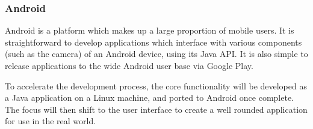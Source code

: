 \subsubsection{Android}

Android\cite{android} is a platform which makes up a large proportion of mobile users. It is straightforward to develop applications which interface with various components (such as the camera) of an Android device, using its Java\cite{java} API. It is also simple to release applications to the wide Android user base via Google Play\cite{googleplay}.

To accelerate the development process, the core functionality will be developed as a Java application on a Linux machine, and ported to Android once complete. The focus will then shift to the user interface to create a well rounded application for use in the real world.